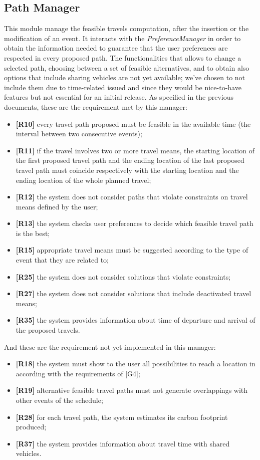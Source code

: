 \subsection{Path Manager}
This module manage the feasible travels computation, after the insertion or the modification of an event. It interacts with the \textit{PreferenceManager} in order to obtain the information needed to guarantee that the user preferences are respected in every proposed path.
The functionalities that allows to change a selected path, choosing between a set of feasible alternatives, and to obtain also options that include sharing vehicles are not yet available; we've chosen to not include them due to time-related issued and since they would be nice-to-have features but not essential for an initial release.
As specified in the previous documents, these are the requirement met by this manager:
\begin{itemize}
	\item \textbf{[R10]} every travel path proposed must be feasible in the available time (the interval between two consecutive events);
	\item \textbf{[R11]} if the travel involves two or more travel means, the starting location of the first proposed travel path and the ending location of the last proposed travel path must coincide respectively with the starting location and the ending location of the whole planned travel;
	\item \textbf{[R12]} the system does not consider paths that violate constraints on travel means defined by the user;
	\item \textbf{[R13]} the system checks user preferences to decide which feasible travel path is the best;
	\item \textbf{[R15]} appropriate travel means must be suggested according to the type of event that they are related to;
	\item \textbf{[R25]} the system does not consider solutions that violate constraints;
	\item \textbf{[R27]} the system does not consider solutions that include deactivated travel means;
	\item \textbf{[R35]} the system provides information about time of departure and arrival of the proposed travels.
\end{itemize}
And these are the requirement not yet implemented in this manager:
\begin{itemize}
	\item \textbf{[R18]} the system must show to the user all possibilities to reach a location in according with the requirements of [G4];
	\item \textbf{[R19]} alternative feasible travel paths must not generate overlappings with other events of the schedule;
	\item \textbf{[R28]} for each travel path, the system estimates its carbon footprint produced;
	\item \textbf{[R37]} the system provides information about travel time with shared vehicles.
\end{itemize}

